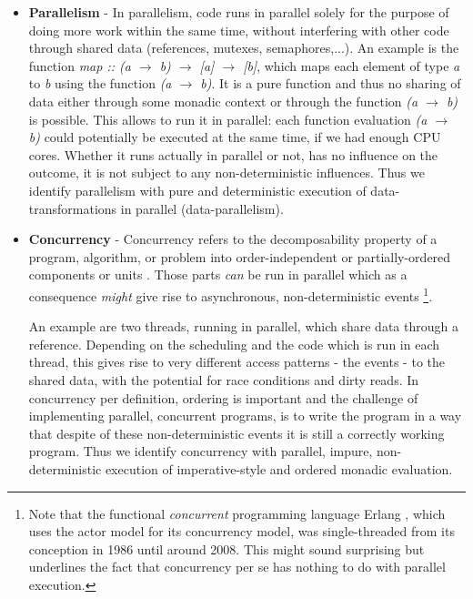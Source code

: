 \begin{itemize}
	\item \textbf{Parallelism} - In parallelism, code runs in parallel solely for the purpose of doing more work within the same time, without interfering with other code through shared data (references, mutexes, semaphores,...). An example is the function \textit{map :: (a $\rightarrow$ b) $\rightarrow$ [a] $\rightarrow$ [b]}, which maps each element of type \textit{a} to \textit{b} using the function \textit{(a $\rightarrow$ b)}. It is a pure function and thus no sharing of data either through some monadic context or through the function \textit{(a $\rightarrow$ b)} is possible. This allows to run it in parallel: each function evaluation \textit{(a $\rightarrow$ b)} could potentially be executed at the same time, if we had enough CPU cores. Whether it runs actually in parallel or not, has no influence on the outcome, it is not subject to any non-deterministic influences. Thus we identify parallelism with pure and deterministic execution of data-transformations in parallel (data-parallelism).

	\item \textbf{Concurrency} - Concurrency refers to the decomposability property of a program, algorithm, or problem into order-independent or partially-ordered components or units \cite{lamport_time_1978}. Those parts \textit{can} be run in parallel which as a consequence \textit{might} give rise to asynchronous, non-deterministic events \footnote{Note that the functional \textit{concurrent} programming language Erlang \cite{armstrong_erlang_2010}, which uses the actor model for its concurrency model, was single-threaded from its conception in 1986 until around 2008. This might sound surprising but underlines the fact that concurrency per se has nothing to do with parallel execution.}.

	An example are two threads, running in parallel, which share data through a reference. Depending on the scheduling and the code which is run in each thread, this gives rise to very different access patterns - the events - to the shared data, with the potential for race conditions and dirty reads. In concurrency per definition, ordering is important and the challenge of implementing parallel, concurrent programs, is to write the program in a way that despite of these non-deterministic events it is still a correctly working program. Thus we identify concurrency with parallel, impure, non-deterministic execution of imperative-style and ordered monadic evaluation.
\end{itemize}

